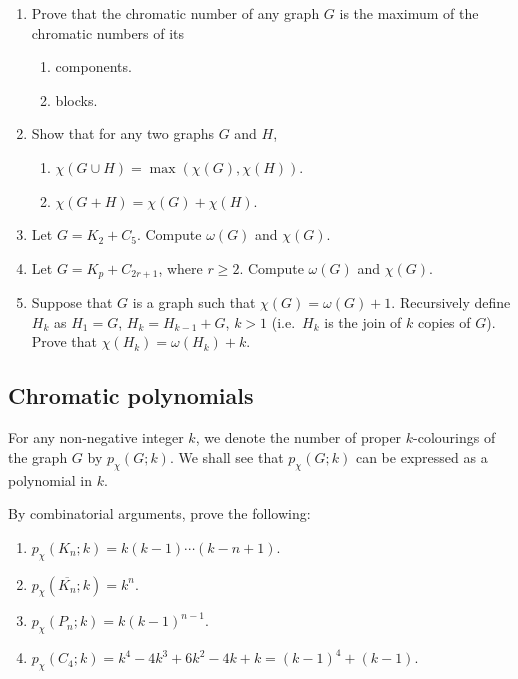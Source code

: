 \begin{Exercise}
\begin{enumerate}
\item Prove that the chromatic number of any graph $G$ is the maximum of the chromatic numbers of its
\begin{enumerate}[label = (\roman*)]
\item components.
\item blocks.
\end{enumerate}

\item Show that for any two graphs $G$ and $H$,
\begin{enumerate}[label = (\roman*)]
\item $\chi(G \cup H) = \max(\chi(G), \chi(H))$.
\item $\chi(G + H) = \chi(G) + \chi(H)$.
\end{enumerate}

\item Let $G = K_2 + C_5$. Compute $\omega(G)$ and $\chi(G)$.

\item Let $G = K_p + C_{2r + 1}$, where $r \ge 2$. Compute $\omega(G)$ and $\chi(G)$.

\item Suppose that $G$ is a graph such that $\chi(G) = \omega(G) + 1$. Recursively define $H_k$ as $H_1 = G$, $H_k = H_{k - 1} + G$, $k > 1$ (i.e.\ $H_k$ is the join of $k$ copies of $G$). Prove that $\chi(H_k) = \omega(H_k) + k$.
\end{enumerate}
\end{Exercise}

\subsection*{Chromatic polynomials}\label{subsec:ChromaticPolynomials}

For any non-negative integer $k$, we denote the number of proper $k$-colourings of the graph $G$ by $p_\chi(G; k)$. We shall see that $p_\chi(G; k)$ can be expressed as a polynomial in $k$.

\begin{Exercise}
By combinatorial arguments, prove the following:
\begin{enumerate}
\item $p_\chi(K_n; k) = k(k - 1) \cdots (k - n + 1)$.

\item $p_\chi(\overline{K_n}; k) = k^n$.

\item $p_\chi(P_n; k) = k(k - 1)^{n - 1}$.

\item $p_\chi(C_4; k) = k^4 - 4k^3 + 6k^2 - 4k + k = (k - 1)^4 + (k - 1)$. 
\end{enumerate}
\end{Exercise}

